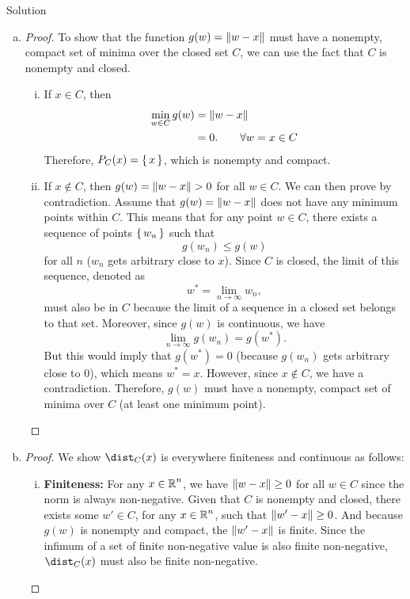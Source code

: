 \documentclass{article}
\begin{document}
\begin{solution}
    {Solution}
    \begin{enumerate}[(a)]
        \item {
            \begin{proof}
            To show that the function $g(w)=\lVert w-x\rVert$ must have a nonempty, compact set of minima over the closed set $C$, we can use the fact that $C$ is nonempty and closed.
            \begin{enumerate}[(i)]
                \item If $x\in C$, then {
                    \begin{align*}
                        \min_{w\in C} g(w)
                        & =\lVert w-x\rVert \\
                        &=0. \qquad \forall w=x\in C
                    \end{align*}
                }
                Therefore, $P_C(x)=\left\lbrace\,x\,\right\rbrace$, which is nonempty and compact.
                \item If $x\notin C$, then $g(w)=\lVert w-x\rVert>0$ for all $w\in C$. We can then prove by contradiction. Assume that $g(w)=\lVert w-x\rVert$ does not have any minimum points within $C$. This means that for any point $w\in C$, there exists a sequence of points $\left\lbrace\,w_n\,\right\rbrace$ such that
                \[g(w_n)\leq g(w)\]
                for all $n$ (\ie $w_n$ gets arbitrary close to $x$). Since $C$ is closed, the limit of this sequence, denoted as \[w^*=\lim_{n\rightarrow\infty}w_n,\] must also be in $C$ because the limit of a sequence in a closed set belongs to that set. Moreover, since $g(w)$ is continuous, we have \[\lim_{n\rightarrow\infty}g(w_n) = g(w^*).\]
                But this would imply that $g(w^*)=0$ (because $g(w_n)$ gets arbitrary close to $0$), which means $w^*=x$. However, since $x\notin C$, we have a contradiction. Therefore, $g(w)$ must have a nonempty, compact set of minima over $C$ (at least one minimum point).
            \end{enumerate}
        \end{proof}
        }
        \item {
            \begin{proof}
                We show $\dist_C(x)$ is everywhere finiteness and continuous as follows:
                \begin{enumerate}[(i)]
                    \item \textbf{Finiteness:} For any $x\in \operatorname{\mathbb{R}}^n$, we have $\lVert w-x\rVert\geq 0$ for all $w\in C$ since the norm is always non-negative. Given that $C$ is nonempty and closed, there exists some $w'\in C$, for any $x\in \operatorname{\mathbb{R}}^n$, such that $\lVert w'-x\rVert\geq 0$. And because $g(w)$ is nonempty and compact, the $\lVert w'-x\rVert$ is finite. Since the infimum of a set of finite non-negative value is also finite non-negative, $\dist_C(x)$ must also be finite non-negative.

\end{enumerate}
\end{proof}}
\end{enumerate}
\end{solution}
\end{document}
